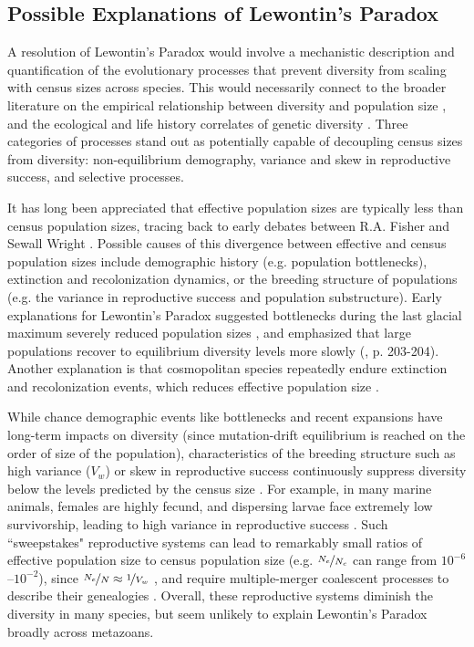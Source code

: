 \documentclass[11pt]{article}
\begin{document}
\subsection*{Possible Explanations of Lewontin's Paradox}

A resolution of Lewontin's Paradox would involve a mechanistic description and
quantification of the evolutionary processes that prevent diversity from
scaling with census sizes across species. This would necessarily connect to the
broader literature on the empirical relationship between diversity and
population size
\parencite{Frankham1996-yb,Nei1984-zi,Soule1976-he,Leroy2021-gy}, and the
ecological and life history correlates of genetic diversity
\parencite{Nevo1978-wh,Powell1975-lg,Nevo1984-hp}. Three categories of
processes stand out as potentially capable of decoupling census sizes from
diversity: non-equilibrium demography, variance and skew in reproductive
success, and selective processes.

It has long been appreciated that effective population sizes are typically less
than census population sizes, tracing back to early debates between R.A. Fisher
and Sewall Wright \parencite{Fisher1947-tf,Wright1948-fj}. Possible causes of
this divergence between effective and census population sizes include
demographic history (e.g. population bottlenecks), extinction and
recolonization dynamics, or the breeding structure of populations (e.g. the
variance in reproductive success and population substructure). Early
explanations for Lewontin's Paradox suggested bottlenecks during the last
glacial maximum severely reduced population sizes
\parencite{Kimura1984-ia,Ohta1973-pk,Nei1984-zi}, and emphasized that large
populations recover to equilibrium diversity levels more slowly
(\cite{Nei1984-zi}, \cite{Kimura1984-ia} p. 203-204). Another explanation is
that cosmopolitan species repeatedly endure extinction and recolonization
events, which reduces effective population size
\parencite{Maruyama1980-xz,Slatkin1977-kd}. 

While chance demographic events like bottlenecks and recent expansions have
long-term impacts on diversity (since mutation-drift equilibrium is reached on
the order of size of the population), characteristics of the breeding structure
such as high variance ($V_w$) or skew in reproductive success continuously
suppress diversity below the levels predicted by the census size
\parencite{Wright1938-tv}. For example, in many marine animals, females are
highly fecund, and dispersing larvae face extremely low survivorship, leading
to high variance in reproductive success
\parencite{Waples2018-kb,Waples2013-wi,Hedgecock2011-ku,Hauser2008-fd}. Such
``sweepstakes" reproductive systems can lead to remarkably small ratios of
effective population size to census population size (e.g. $\nicefrac{N_e}{N_c}$
can range from $10^{-6}$--$10^{-2}$), since $\nicefrac{N_e}{N} \approx
\nicefrac{1}{V_w}$
\parencite{Hedgecock1994-gs,Wright1938-tv,Nunney1993-ef,Nunney1996-wy}, and
require multiple-merger coalescent processes to describe their genealogies
\parencite{Eldon2006-ui}. Overall, these reproductive systems diminish the
diversity in many species, but seem unlikely to explain Lewontin's Paradox
broadly across metazoans.
\end{document}
